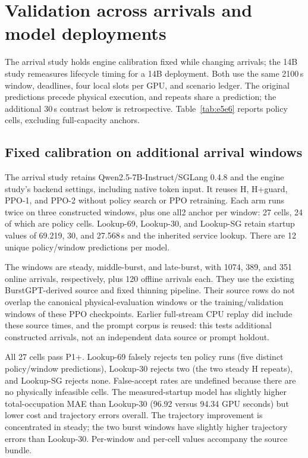 \section{Validation across arrivals and model deployments}
\label{app:e5e6}
The arrival study holds engine calibration fixed while changing arrivals; the 14B study remeasures
lifecycle timing for a 14B deployment. Both use the same 2100\,s window,
deadlines, four local slots per GPU, and scenario ledger. The original predictions precede
physical execution, and repeats share a prediction; the additional 30\,s
contrast below is retrospective. Table~\ref{tab:e5e6}
reports policy cells, excluding full-capacity anchors.

\subsection{Fixed calibration on additional arrival windows}
The arrival study retains Qwen2.5-7B-Instruct/SGLang 0.4.8 and the engine study's backend settings,
including native token input. It reuses H, H+guard, PPO-1, and PPO-2
without policy search or PPO retraining. Each arm runs twice on three
constructed windows, plus one all2 anchor per window: 27 cells,
24 of which are policy cells. Lookup-69, Lookup-30, and Lookup-SG retain startup
values of 69.219, 30, and 27.568\,s and the inherited service lookup.
There are 12 unique policy/window predictions per model.

The windows are steady, middle-burst, and late-burst, with 1074, 389,
and 351 online arrivals, respectively, plus 120 offline arrivals each.
They use the existing BurstGPT-derived source and fixed thinning pipeline.
Their source rows do not overlap the canonical physical-evaluation windows
or the training/validation windows of these PPO checkpoints. Earlier
full-stream CPU replay did include these source times, and the prompt
corpus is reused: this tests additional constructed arrivals, not an
independent data source or prompt holdout.

All 27 cells pass P1+. Lookup-69 falsely rejects ten policy runs (five distinct
policy/window predictions), Lookup-30 rejects two (the two steady H repeats),
and Lookup-SG rejects none. False-accept rates are undefined because
there are no physically infeasible cells. The measured-startup model has
slightly higher total-occupation MAE than Lookup-30 (96.92 versus 94.34 GPU seconds)
but lower cost and trajectory errors overall. The trajectory improvement is
concentrated in steady; the two burst windows have slightly higher trajectory
errors than Lookup-30. Per-window and per-cell values accompany the source bundle.

